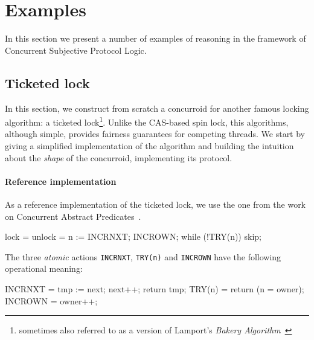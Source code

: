 \section{Examples}
\label{sec:examples}

In this section we present a number of examples of reasoning in the
framework of Concurrent Subjective Protocol Logic.




\subsection{Ticketed lock}
\label{sec:ticketed-lock}

In this section, we construct from scratch a concurroid for another
famous locking algorithm: a ticketed lock\footnote{sometimes also
  referred to as a version of Lamport's \emph{Bakery
    Algorithm}~\cite[Section 2.6]{Herlihy-Shavit:08}}. Unlike the CAS-based
spin lock, this algorithms, although simple, provides fairness
guarantees for competing threads. We start by giving a simplified
implementation of the algorithm and building the intuition about the
\emph{shape} of the concurroid, implementing its protocol. 

\paragraph{Reference implementation}
\label{sec:refer-impl}

As a reference implementation of the ticketed lock, we use the one
from the work on Concurrent Abstract
Predicates~\cite{DinsdaleYoung-al:ECOOP10}. 

\begin{code}
 lock = {                       unlock = {
   n := INCRNXT;                INCROWN;         
   while (!TRY(n)) skip;       }
 }  
\end{code} 

The three \emph{atomic} actions \texttt{INCRNXT}, \texttt{TRY(n)}
and \texttt{INCROWN} have the following operational meaning:

\begin{code}
 INCRNXT  = { tmp := next; next++; return tmp; }
 TRY(n)     = { return (n = owner); }
 INCROWN = { owner++; }  
\end{code}

